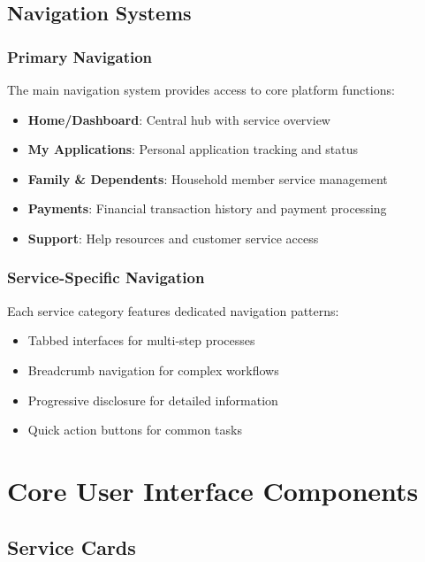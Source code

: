 \documentclass[12pt,a4paper]{article}
\begin{document}
\subsection{Navigation Systems}

\subsubsection{Primary Navigation}

The main navigation system provides access to core platform functions:

\begin{itemize}
    \item \textbf{Home/Dashboard}: Central hub with service overview
    \item \textbf{My Applications}: Personal application tracking and status
    \item \textbf{Family \& Dependents}: Household member service management
    \item \textbf{Payments}: Financial transaction history and payment processing
    \item \textbf{Support}: Help resources and customer service access
\end{itemize}

\subsubsection{Service-Specific Navigation}

Each service category features dedicated navigation patterns:

\begin{itemize}
    \item Tabbed interfaces for multi-step processes
    \item Breadcrumb navigation for complex workflows
    \item Progressive disclosure for detailed information
    \item Quick action buttons for common tasks
\end{itemize}

\section{Core User Interface Components}

\subsection{Service Cards}
\end{document}

